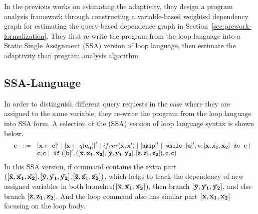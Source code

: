 In the previous works on estimating the adaptivity, they design a program analysis framework
through constructing a variable-based weighted dependency graph for
estimating the query-based dependence graph in Section~\ref{sec:prework-formalization}.
They first re-write the program from the loop language into
a Static Single Assignment (SSA) version of loop language, then estimate the adaptivity than program analysis algorithm.
\subsection*{SSA-Language}
In order to distinguish different query requests in the case where they are assigned to
the same variable, they re-write the program from the loop language into SSA form.
A selection of the (SSA) version of loop language syntax is shown below.
\[
\begin{array}{llll}
 & \ssa{c} & ::= &   [\assign {\ssa{x}}{ \ssa{\expr}}]^{l} ~|~  [\assign {{\ssa{x}} } {q({\ssa{e_q}})}]^{l}
%
~|~  {{ifvar(\bar{\ssa{x}}, \bar{\ssa{x}}')}}  ~|~ [\eskip]^{l}  ~|~
 \eloop ~ [{\ssa{\aexpr}}]^{l}, {n},  [\bar{\ssa{x}}, \bar{\ssa{x_1}}, \bar{\ssa{x_2}}] ~ \edo ~ {\ssa{c}}  ~|~ \\ &&& \ssa{c};\ssa{c}  ~|~  \eif([\ssa{\bexpr}]^{l}, ([\bar{\ssa{x}}, \bar{\ssa{x_1}}, \bar{\ssa{x_2}}] , [\bar{\ssa{y}}, \bar{\ssa{y_1}}, \bar{\ssa{y_2}}],[\bar{\ssa{z}}, \bar{\ssa{z_1}}, \bar{\ssa{z_2}}] ) , \ssa{c}, \ssa{c}) 	
\end{array}
\]
In this SSA version, if command contains the extra part $([\bar{{\bf{{x}}}}, \bar{{\bf{{x_1}}}}, \bar{{\bf{{x_2}}}}] ,
[\bar{{\bf{{y}}}}, \bar{{\bf{{y_1}}}}, \bar{{\bf{{y_2}}}}],[\bar{{\bf{{z}}}}, \bar{{\bf{{z_1}}}}, \bar{{\bf{{z_2}}}}] )$,
which helps to track the dependency of new assigned variables in both branches($[\bar{{\bf{{x}}}}, \bar{{\bf{{x_1}}}}, \bar{{\bf{{x_2}}}}]$),
then branch $[\bar{{\bf{{y}}}}, \bar{{\bf{{y_1}}}}, \bar{{\bf{{y_2}}}}]$, and else branch $[\bar{{\bf{{z}}}}, \bar{{\bf{{z_1}}}}, \bar{{\bf{{z_2}}}}] $. 
And the loop command also has similar part $ [\bar{{\bf{{x}}}}, \bar{{\bf{{x_1}}}}, \bar{{\bf{{x_2}}}}]$ focusing on the loop body.

